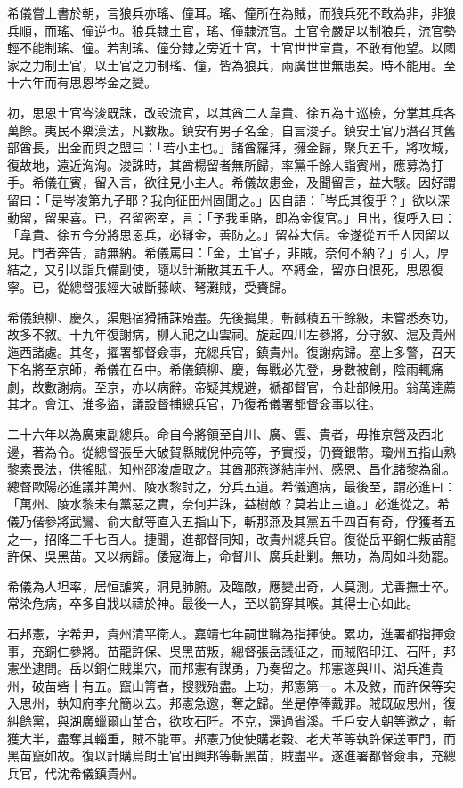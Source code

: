 \begin{pinyinscope}
希儀嘗上書於朝，言狼兵亦瑤、僮耳。瑤、僮所在為賊，而狼兵死不敢為非，非狼兵順，而瑤、僮逆也。狼兵隸土官，瑤、僮隸流官。土官令嚴足以制狼兵，流官勢輕不能制瑤、僮。若割瑤、僮分隸之旁近土官，土官世世富貴，不敢有他望。以國家之力制土官，以土官之力制瑤、僮，皆為狼兵，兩廣世世無患矣。時不能用。至十六年而有思恩岑金之變。

初，思恩土官岑浚既誅，改設流官，以其酋二人韋貴、徐五為土巡檢，分掌其兵各萬餘。夷民不樂漢法，凡數叛。鎮安有男子名金，自言浚子。鎮安土官乃潛召其舊部酋長，出金而與之盟曰：「若小主也。」諸酋羅拜，擁金歸，聚兵五千，將攻城，復故地，遠近洶洶。浚誅時，其酋楊留者無所歸，率黨千餘人詣賓州，應募為打手。希儀在賓，留入言，欲往見小主人。希儀故患金，及聞留言，益大駭。因好謂留曰：「是岑浚第九子耶？我向征田州固聞之。」因自語：「岑氏其復乎？」欲以深動留，留果喜。已，召留密室，言：「予我重賂，即為金復官。」且出，復呼入曰：「韋貴、徐五今分將思恩兵，必讎金，善防之。」留益大信。金遂從五千人因留以見。門者奔告，請無納。希儀罵曰：「金，土官子，非賊，奈何不納？」引入，厚結之，又引以詣兵備副使，隨以計漸散其五千人。卒縛金，留亦自恨死，思恩復寧。已，從總督張經大破斷藤峽、弩灘賊，受賚歸。

希儀鎮柳、慶久，渠魁宿猾捕誅殆盡。先後搗巢，斬馘積五千餘級，未嘗悉奏功，故多不敘。十九年復謝病，柳人祀之山雲祠。旋起四川左參將，分守敘、滬及貴州迤西諸處。其冬，擢署都督僉事，充總兵官，鎮貴州。復謝病歸。塞上多警，召天下名將至京師，希儀在召中。希儀鎮柳、慶，每戰必先登，身數被創，陰雨輒痛劇，故數謝病。至京，亦以病辭。帝疑其規避，褫都督官，令赴部候用。翁萬達薦其才。會江、淮多盜，議設督捕總兵官，乃復希儀署都督僉事以往。

二十六年以為廣東副總兵。命自今將領至自川、廣、雲、貴者，毋推京營及西北邊，著為令。從總督張岳大破賀縣賊倪仲亮等，予實授，仍賚銀幣。瓊州五指山熟黎素畏法，供徭賦，知州邵浚虐取之。其酋那燕遂結崖州、感恩、昌化諸黎為亂。總督歐陽必進議并萬州、陵水黎討之，分兵五道。希儀適病，最後至，謂必進曰：「萬州、陵水黎未有黨惡之實，奈何并誅，益樹敵？莫若止三道。」必進從之。希儀乃偕參將武鸞、俞大猷等直入五指山下，斬那燕及其黨五千四百有奇，俘獲者五之一，招降三千七百人。捷聞，進都督同知，改貴州總兵官。復從岳平銅仁叛苗龍許保、吳黑苗。又以病歸。倭寇海上，命督川、廣兵赴剿。無功，為周如斗劾罷。

希儀為人坦率，居恒謔笑，洞見肺腑。及臨敵，應變出奇，人莫測。尤善撫士卒。常染危病，卒多自戕以禱於神。最後一人，至以箭穿其喉。其得士心如此。

石邦憲，字希尹，貴州清平衛人。嘉靖七年嗣世職為指揮使。累功，進署都指揮僉事，充銅仁參將。苗龍許保、吳黑苗叛，總督張岳議征之，而賊陷印江、石阡，邦憲坐逮問。岳以銅仁賊巢穴，而邦憲有謀勇，乃奏留之。邦憲遂與川、湖兵進貴州，破苗砦十有五。竄山箐者，搜戮殆盡。上功，邦憲第一。未及敘，而許保等突入思州，執知府李允簡以去。邦憲急邀，奪之歸。坐是停俸戴罪。賊既破思州，復糾餘黨，與湖廣蠟爾山苗合，欲攻石阡。不克，還過省溪。千戶安大朝等邀之，斬獲大半，盡奪其輜重，賊不能軍。邦憲乃使使購老穀、老犬革等執許保送軍門，而黑苗竄如故。復以計購烏朗土官田興邦等斬黑苗，賊盡平。遂進署都督僉事，充總兵官，代沈希儀鎮貴州。


\end{pinyinscope}
